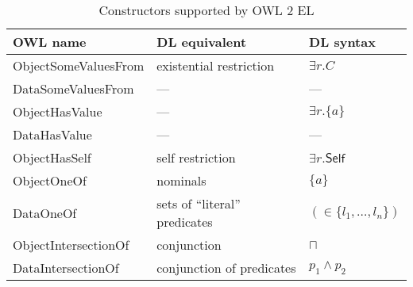 \documentclass{article}
\begin{document}
\begin{table}
  \caption{Constructors supported by OWL 2 EL\label{table:constructors}}
  \begin{center}
    \begin{tabular}{@{}lll@{}}
      \toprule
      OWL name & DL equivalent & DL syntax \\
      \midrule
      ObjectSomeValuesFrom & existential restriction & $\exists r. C$ \\
      DataSomeValuesFrom & ---\footnotemark[3]  & --- \\
      ObjectHasValue & --- & $\exists r. \{a\}$ \\
      DataHasValue & ---\footnotemark[3] & --- \\
      ObjectHasSelf & self restriction & $\exists r.\mathsf{Self}$ \\
      ObjectOneOf & nominals\footnotemark[4] & $\{a\}$ \\
      DataOneOf & sets of ``literal'' predicates & $(\in \{l_1, \dots, l_n\})$ \\
      ObjectIntersectionOf & conjunction & $\sqcap$ \\
      DataIntersectionOf & conjunction of predicates & $p_1 \land p_2$ \\
      \bottomrule
    \end{tabular}
  \end{center}
\end{table}
\end{document}
